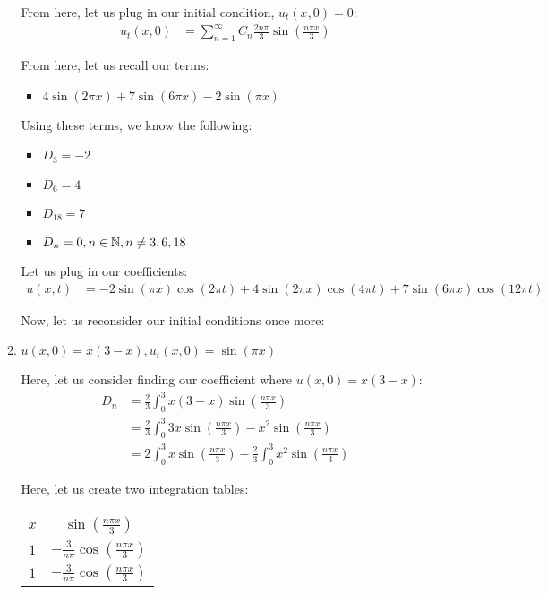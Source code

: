 \documentclass{article}
\begin{document}
\begin{enumerate}
\begin{enumerate}
     From here, let us plug in our initial condition, $u_t(x, 0) = 0$:
     \begin{align}
       u_t(x, 0) & =
       \sum^\infty_{n = 1}
       C_n
       \frac{2 n \pi}{3} \sin \left( \frac{n \pi x}{3} \right)
     \end{align}

     From here, let us recall our terms:
     \begin{itemize}
       \item $4 \sin(2 \pi x) + 7 \sin(6 \pi x) - 2\sin(\pi x)$
     \end{itemize}

     Using these terms, we know the following:
     \begin{itemize}
       \item $D_3 = -2$
       \item $D_6 = 4$
       \item $D_{18} = 7$
       \item $D_n = 0, n \in \mathbb N, n \neq 3, 6, 18$
     \end{itemize}


     Let us plug in our coefficients:
     \begin{align}
       u(x, t) & =
       - 2\sin(\pi x) \cos(2 \pi t)
       + 4\sin(2 \pi x) \cos(4 \pi t)
       + 7 \sin(6 \pi x) \cos(12 \pi t)
     \end{align}

     Now, let us reconsider our initial conditions once more:
     \setcounter{enumii}{4}
     \item $u(x, 0) = x(3 - x), u_t(x, 0) = \sin(\pi x)$

     Here, let us consider finding our coefficient where $u(x, 0) = x(3 - x)$:
     \begin{align}
       D_n & =
       \frac{2}{3} \int^3_0 x(3 - x) \sin\left(\frac{n \pi x}{3}\right)\\
       & =
       \frac{2}{3} \int^3_0 3x \sin\left(\frac{n \pi x}{3}\right) - x^2 \sin\left(\frac{n \pi x}{3}\right)\\
       & =
       2 \int^3_0 x \sin\left(\frac{n \pi x}{3}\right) -
       \frac{2}{3} \int^3_0  x^2 \sin\left(\frac{n \pi x}{3}\right)
     \end{align}

     Here, let us create two integration tables:
     \begin{center}
       \begin{tabular}{c|c}
         $x$ & $\sin\left(\frac{n \pi x}{3}\right)$\\
         \hline
         $1$ & $-\frac{3}{n \pi} \cos\left(\frac{n \pi x}{3}\right)$\\
         \hline
         $1$ & $-\frac{3}{n \pi} \cos\left(\frac{n \pi x}{3}\right)$
       \end{tabular}
     \end{center}


\end{enumerate}
\end{enumerate}
\end{document}
